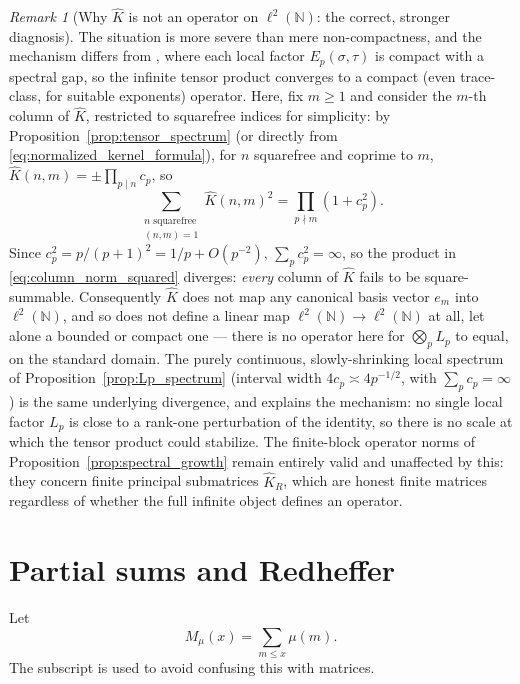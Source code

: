 \documentclass[11pt]{amsart}
\numberwithin{equation}{section}
\theoremstyle{plain}
\theoremstyle{definition}
\theoremstyle{remark}
\newtheorem{remark}[theorem]{Remark}
\newcommand{\N}{\mathbb N}
\newcommand{\mob}{\mu}
\begin{document}
\begin{remark}[Why \(\widehat K\) is not an operator on \(\ell^2(\N)\): the correct, stronger diagnosis]
\label{rem:noncompactness_structural}
The situation is more severe than mere non-compactness, and the mechanism differs from \cite{HilberdinkPushnitski2021}, where each local factor \(E_p(\sigma,\tau)\) is compact with a spectral gap, so the infinite tensor product converges to a compact (even trace-class, for suitable exponents) operator. Here, fix \(m\ge1\) and consider the \(m\)-th column of \(\widehat K\), restricted to squarefree indices for simplicity: by Proposition~\ref{prop:tensor_spectrum} (or directly from \eqref{eq:normalized_kernel_formula}), for \(n\) squarefree and coprime to \(m\), \(\widehat K(n,m)=\pm\prod_{p\mid n}c_p\), so
\begin{equation}
\sum_{\substack{n\text{ squarefree}\\(n,m)=1}}\widehat K(n,m)^2=\prod_{p\nmid m}(1+c_p^2).
\label{eq:column_norm_squared}
\end{equation}
Since \(c_p^2=p/(p+1)^2=1/p+O(p^{-2})\), \(\sum_pc_p^2=\infty\), so the product in \eqref{eq:column_norm_squared} diverges: \emph{every} column of \(\widehat K\) fails to be square-summable. Consequently \(\widehat K\) does not map any canonical basis vector \(e_m\) into \(\ell^2(\N)\), and so does not define a linear map \(\ell^2(\N)\to\ell^2(\N)\) at all, let alone a bounded or compact one — there is no operator here for \(\bigotimes_pL_p\) to equal, on the standard domain. The purely continuous, slowly-shrinking local spectrum of Proposition~\ref{prop:Lp_spectrum} (interval width \(4c_p\asymp4p^{-1/2}\), with \(\sum_pc_p=\infty\)) is the same underlying divergence, and explains the mechanism: no single local factor \(L_p\) is close to a rank-one perturbation of the identity, so there is no scale at which the tensor product could stabilize. The finite-block operator norms of Proposition~\ref{prop:spectral_growth} remain entirely valid and unaffected by this: they concern finite principal submatrices \(\widehat K_R\), which are honest finite matrices regardless of whether the full infinite object defines an operator.
\end{remark}

\section{Partial sums and Redheffer}
\label{sec:redheffer}

Let
\begin{equation}
M_{\mob}(x)=\sum_{m\le x}\mob(m).
\label{eq:Mertens_def}
\end{equation}
The subscript is used to avoid confusing this with matrices.
\end{document}
